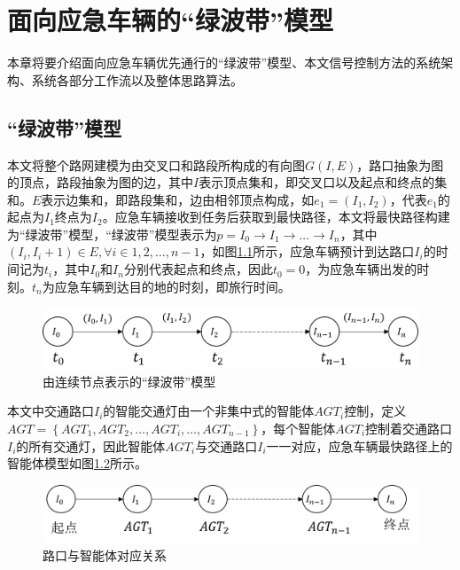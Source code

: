\chapter{面向应急车辆的“绿波带”模型}
\label{ch3}

本章将要介绍面向应急车辆优先通行的“绿波带”模型、本文信号控制方法的系统架构、系统各部分工作流以及整体思路算法。

\section{“绿波带”模型}
本文将整个路网建模为由交叉口和路段所构成的有向图${G(I, E)}$，路口抽象为图的顶点，路段抽象为图的边，其中${I}$表示顶点集和，即交叉口以及起点和终点的集和。${E}$表示边集和，即路段集和，边由相邻顶点构成，如${e_1=(I_1, I_2)}$，代表${e_1}$的起点为${I_1}$终点为${I_2}$。应急车辆接收到任务后获取到最快路径，本文将最快路径构建为“绿波带”模型，“绿波带”模型表示为${p=I_0\rightarrow I_1\rightarrow\ldots\rightarrow I_n}$，其中${(I_i, I_i+1) \in E, \forall i \in 1, 2, \ldots, n-1}$，如图\ref{fig:path}所示，应急车辆预计到达路口${I_i}$的时间记为${t_i}$，其中${I_0}$和${I_n}$分别代表起点和终点，因此${t_0=0}$，为应急车辆出发的时刻。${t_n}$为应急车辆到达目的地的时刻，即旅行时间。


\begin{figure}[H]
	\centering
	\includegraphics[width=\textwidth]{figures/path.png}
	\caption{由连续节点表示的“绿波带”模型}
	\label{fig:path}
\end{figure}

本文中交通路口${I_i}$的智能交通灯由一个非集中式的智能体${AGT_i}$控制，定义${AGT=\left\{ {AGT_1, AGT_2, \ldots , AGT_i, \ldots, AGT_{n-1}} \right\}}$，每个智能体${AGT_i}$控制着交通路口${I_i}$的所有交通灯，因此智能体${AGT_i}$与交通路口${I_i}$一一对应，应急车辆最快路径上的智能体模型如图\ref{fig:agent}所示。

\begin{figure}[H]
	\centering
	\includegraphics[width=\textwidth]{figures/agent.png}
	\caption{路口与智能体对应关系}
	\label{fig:agent}
\end{figure}


